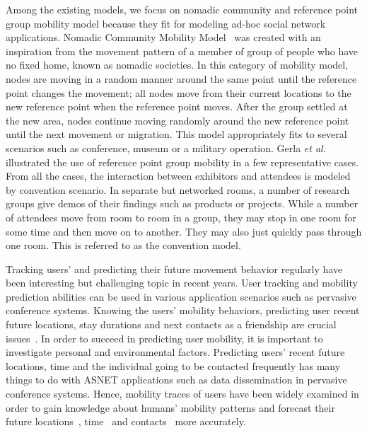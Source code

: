 Among the existing models, we focus on nomadic community and reference point group mobility model because they fit for modeling ad-hoc social network applications. Nomadic Community Mobility Model~\cite{AGainaru2010} was created with an inspiration from the movement pattern of a member of group of people who have no fixed home, known as nomadic societies. In this category of mobility model, nodes are moving in a random manner around the same point until the reference point changes the movement; all nodes move from their current locations to the new reference point when the reference point moves. After the group settled at the new area, nodes continue moving randomly around the new reference point until the next movement or migration. This model appropriately fits to several scenarios such as conference, museum or a military operation. Gerla {\it et al.}~\cite{MGerla2003} illustrated the use of reference point group mobility in a few representative cases. From all the cases, the interaction between exhibitors and attendees is modeled by convention scenario. In separate but networked rooms, a number of research groups give demos of their findings such as products or projects. While a number of attendees move from room to room in a group, they may stop in one room for some time and then move on to another. They may also just quickly pass through one room. This is referred to as the convention model.

Tracking users' and predicting their future movement behavior regularly have been interesting but challenging topic in recent years. User tracking and mobility prediction abilities can be used in various application scenarios such as pervasive conference systems. Knowing the users' mobility behaviors, predicting user recent future locations, stay durations and next contacts as a friendship are crucial issues~\cite{PPirozmand2014}. In order to succeed in predicting user mobility, it is important to investigate personal and environmental factors. Predicting users' recent future locations, time and the individual going to be contacted frequently has many things to do with ASNET applications such as data dissemination in pervasive conference systems. Hence, mobility traces of users have been widely examined in order to gain knowledge about humans' mobility patterns and forecast their future locations~\cite{AAsahara2011}, time~\cite{DTMT2012} and contacts~\cite{HANguyen2012} more accurately.

